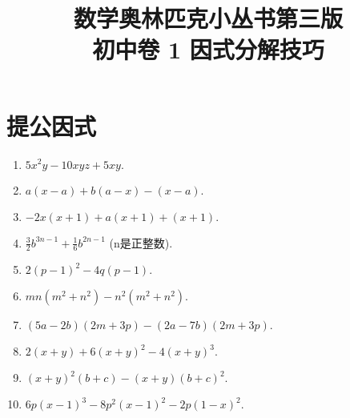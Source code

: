 \documentclass[a4paper,12pt]{article}
\begin{document}

\begin{titlepage}
\title{数学奥林匹克小丛书\;第三版\\初中卷 1 因式分解技巧}
\maketitle
\end{titlepage}

\tableofcontents
\newpage

\section{提公因式}

\begin{multicols}{2}
\begin{enumerate}
\item $5 x ^ { 2 } y - 1 0 x y z + 5 x y .$

\item $a ( x - a ) + b ( a - x ) - ( x - a ) .$

\item $- 2 x ( x + 1 ) + a ( x + 1 ) + ( x + 1 ) .$

\item ${ \frac { 3 } { 2 } } b ^ { 3 n - 1 } + { \frac { 1 } { 6 } } b ^ { 2 n - 1 }$ (n是正整数).

\item $2 ( p - 1 ) ^ { 2 } - 4 q ( p - 1 ) .$

\item $m n ( m ^ { 2 } + n ^ { 2 } ) - n ^ { 2 } ( m ^ { 2 } + n ^ { 2 } ) .$

\item $( 5 a - 2 b ) ( 2 m + 3 p ) - ( 2 a - 7 b ) ( 2 m + 3p ) .$

\item $2 ( x + y ) + 6 ( x + y ) ^ { 2 } - 4 ( x + y ) ^ { 3 } .$

\item $( x + y ) ^ { 2 } ( b + c ) - ( x + y ) ( b + c ) ^ { 2 } .$

\item $6 p ( x - 1 ) ^ { 3 } - 8 p ^ { 2 } ( x - 1 ) ^ { 2 } - 2 p ( 1 - x ) ^ { 2 } .$
\end{enumerate}
\end{multicols}
\end{document}
